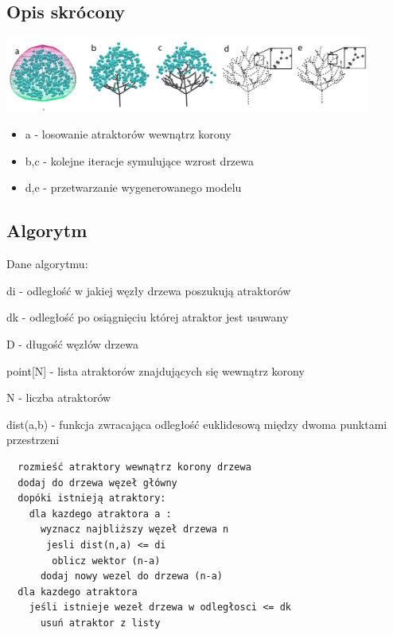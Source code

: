 \subsection{Opis skrócony}
\begin{center}
	\includegraphics[width=120mm]{images/colonization/colonization.png}
	\label{colonization_colonization}
\end{center}
\begin{itemize}
\item a - losowanie atraktorów wewnątrz korony
\item b,c - kolejne iteracje symulujące wzrost drzewa
\item d,e - przetwarzanie wygenerowanego modelu
\end{itemize}


\subsection{Algorytm}

Dane algorytmu:
\begin{my_itemize}
	\item{di - odległość w jakiej węzły drzewa poszukują atraktorów}
	\item{dk - odległość po osiągnięciu której atraktor jest usuwany}
	\item{D - długość węzłów drzewa}
	\item{point[N] - lista atraktorów znajdujących się wewnątrz korony}
	\item{N - liczba atraktorów}
	\item{dist(a,b) - funkcja zwracająca odległość euklidesową między dwoma punktami przestrzeni}
\end{my_itemize}

\begin{verbatim}
  rozmieść atraktory wewnątrz korony drzewa
  dodaj do drzewa węzeł główny
  dopóki istnieją atraktory:
    dla kazdego atraktora a :
      wyznacz najbliższy węzeł drzewa n
       jesli dist(n,a) <= di
        oblicz wektor (n-a)
      dodaj nowy wezel do drzewa (n-a)
  dla kazdego atraktora
    jeśli istnieje wezeł drzewa w odległosci <= dk
      usuń atraktor z listy
\end{verbatim}


